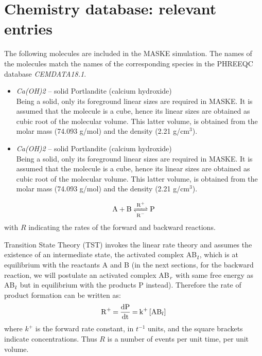 \documentclass[12pt]{paper}    %
\begin{document}
\section{Chemistry database: relevant entries} 

The following molecules are included in the MASKE simulation. The names of the molecules match the names of the corresponding species in the PHREEQC database \textit{CEMDATA18.1}.

\begin{itemize}
\item \textit{Ca(OH)2} -- solid Portlandite (calcium hydroxide) \\ 
Being a solid, only its foreground linear sizes are required in MASKE. It is assumed that the molecule is a cube, hence its linear sizes are obtained as cubic root of the molecular volume. This latter volume, is obtained from the molar mass (74.093 g/mol) and the density (2.21 g/cm$^3$).
%
\item \textit{Ca(OH)2} -- solid Portlandite (calcium hydroxide) \\ 
Being a solid, only its foreground linear sizes are required in MASKE. It is assumed that the molecule is a cube, hence its linear sizes are obtained as cubic root of the molecular volume. This latter volume, is obtained from the molar mass (74.093 g/mol) and the density (2.21 g/cm$^3$).
\end{itemize}




\begin{equation}
\ce{A + B <=>[R+][R-]
P}
\end{equation}
%
with $R$ indicating the rates of the forward and backward reactions.

Transition State Theory (TST) invokes the linear rate theory and assumes the existence of an intermediate state, the activated complex AB$\ce{_l}$, which is at equilibrium with the reactants A and B (in the next sections, for the backward reaction, we will postulate an activated complex AB$\ce{_r}$ with same free energy as AB$\ce{_l}$ but in equilibrium with the products P instead). Therefore the rate of product formation can be written as:
%
\begin{equation}
\ce{R+ = \frac{dP}{dt} = k+ [AB_l]}
\end{equation}
%
where $k^+$ is the forward rate constant, in $t^{-1}$ units, and the square brackets indicate concentrations. Thus $R$ is a number of events per unit time, per unit volume.
\end{document}
